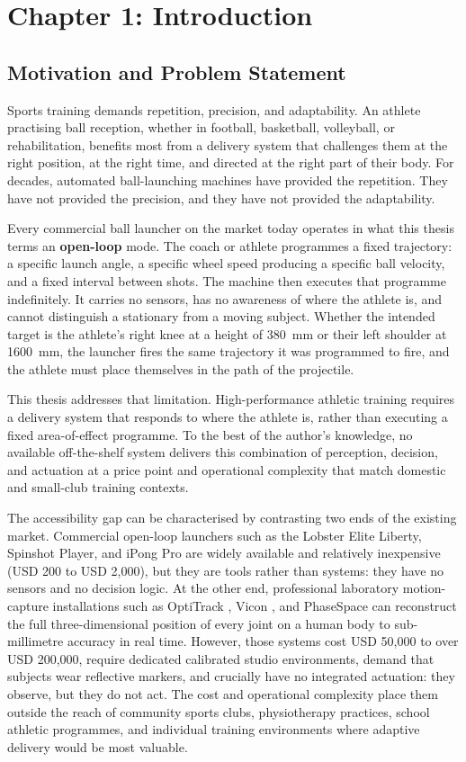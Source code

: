 \chapter{Chapter 1: Introduction}

\section{Motivation and Problem Statement}

Sports training demands repetition, precision, and adaptability. An athlete practising ball reception, whether in football, basketball, volleyball, or rehabilitation, benefits most from a delivery system that challenges them at the right position, at the right time, and directed at the right part of their body. For decades, automated ball-launching machines have provided the repetition. They have not provided the precision, and they have not provided the adaptability.

Every commercial ball launcher on the market today operates in what this thesis terms an \textbf{open-loop} mode. The coach or athlete programmes a fixed trajectory: a specific launch angle, a specific wheel speed producing a specific ball velocity, and a fixed interval between shots. The machine then executes that programme indefinitely. It carries no sensors, has no awareness of where the athlete is, and cannot distinguish a stationary from a moving subject. Whether the intended target is the athlete's right knee at a height of 380~mm or their left shoulder at 1600~mm, the launcher fires the same trajectory it was programmed to fire, and the athlete must place themselves in the path of the projectile.

This thesis addresses that limitation. High-performance athletic training requires a delivery system that responds to where the athlete is, rather than executing a fixed area-of-effect programme. To the best of the author's knowledge, no available off-the-shelf system delivers this combination of perception, decision, and actuation at a price point and operational complexity that match domestic and small-club training contexts.

The accessibility gap can be characterised by contrasting two ends of the existing market. Commercial open-loop launchers such as the Lobster Elite Liberty, Spinshot Player, and iPong Pro are widely available and relatively inexpensive (USD 200 to USD 2{,}000), but they are tools rather than systems: they have no sensors and no decision logic. At the other end, professional laboratory motion-capture installations such as OptiTrack \cite{ref30}, Vicon \cite{ref8}, and PhaseSpace \cite{ref31} can reconstruct the full three-dimensional position of every joint on a human body to sub-millimetre accuracy in real time. However, those systems cost USD 50{,}000 to over USD 200{,}000, require dedicated calibrated studio environments, demand that subjects wear reflective markers, and crucially have no integrated actuation: they observe, but they do not act. The cost and operational complexity place them outside the reach of community sports clubs, physiotherapy practices, school athletic programmes, and individual training environments where adaptive delivery would be most valuable.

